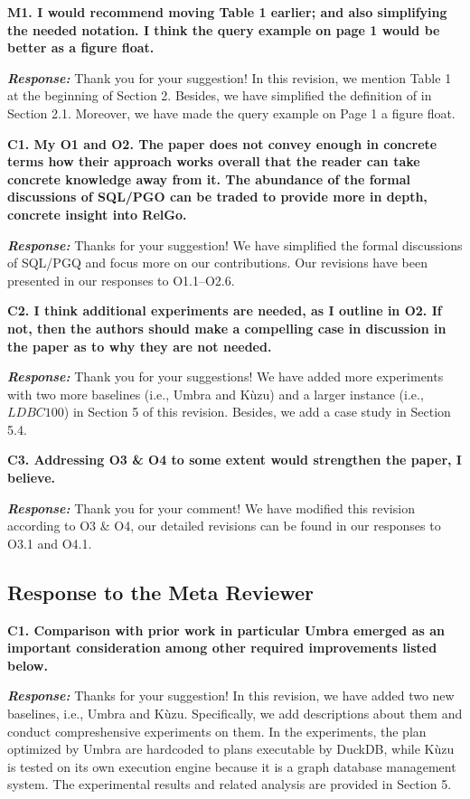 \textbf{M1. I would recommend moving Table 1 earlier; and also simplifying the needed notation. I think the query example on page 1 would be better as a figure float. }

\textbf{\textit{Response: }}
Thank you for your suggestion! 
In this revision, we mention Table 1 at the beginning of Section 2.
Besides, we have simplified the definition of \rgmapping in Section 2.1.
Moreover, we have made the query example on Page 1 a figure float. 


\textbf{
C1. My O1 and O2. The paper does not convey enough in concrete terms how their approach works overall that the reader can take concrete knowledge away from it. The abundance of the formal discussions of SQL/PGO can be traded to provide more in depth, concrete insight into RelGo.}

\textbf{\textit{Response: }}
Thanks for your suggestion! We have  simplified the formal discussions of SQL/PGQ and focus more on our contributions.
Our revisions have been presented in our responses to O1.1--O2.6.


\textbf{
C2. I think additional experiments are needed, as I outline in O2. If not, then the authors should make a compelling case in discussion in the paper as to why they are not needed.}

\textbf{\textit{Response: }}
Thank you for your suggestions! We have added more experiments with two more baselines (i.e., Umbra and K\`uzu) and a larger instance (i.e., $LDBC100$) in Section 5 of this revision.
Besides, we add a case study in Section 5.4.


\textbf{
C3. Addressing O3 \& O4 to some extent would strengthen the paper, I believe.}

\textbf{\textit{Response: }}
Thank you for your comment! We have modified this revision according to O3 \& O4, our detailed revisions can be found in our responses to O3.1 and O4.1.



\subsection{Response to the Meta Reviewer}

\textbf{
C1. Comparison with prior work in particular Umbra emerged as an important consideration among other required improvements listed below.}

\textbf{\textit{Response: }}
Thanks for your suggestion! 
In this revision, we have added two new baselines, i.e., Umbra and K\`uzu.
Specifically, we add descriptions about them and conduct compreshensive experiments on them.
In the experiments, the plan optimized by Umbra are hardcoded to plans executable by DuckDB, while K\`uzu is tested on its own execution engine because it is a graph database management system.
The experimental results and related analysis are provided in Section 5.


